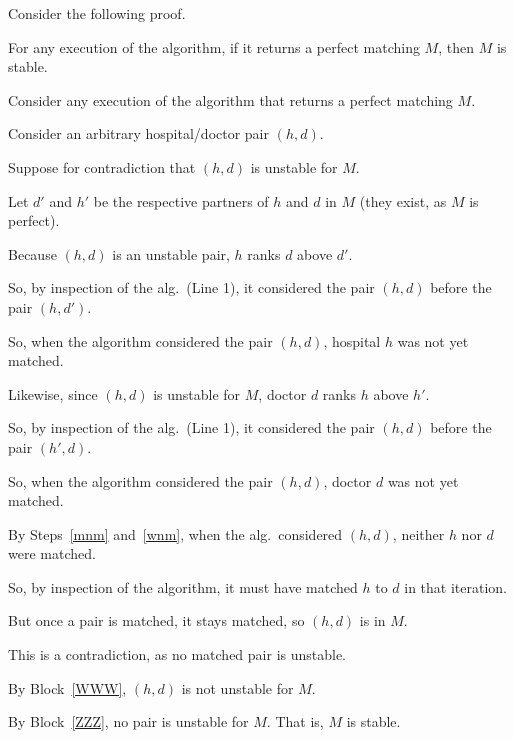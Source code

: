 \documentclass[11pt]{article}
\begin{document}
Consider the following proof.

\begin{lemma}
  For any execution of the algorithm, if it returns a perfect matching $M$, then $M$ is stable.
\end{lemma}
\begin{longFormProof}
  \step Consider any execution of the algorithm that returns a perfect matching $M$.

  \begin{block}\label{ZZZ}

    \step Consider an arbitrary hospital/doctor pair $(h, d)$.

    \begin{block}\label{WWW}
      \step Suppose for contradiction that $(h, d)$ is unstable for $M$.
      
      \step Let $d'$ and $h'$ be the respective partners of $h$ and $d$ in $M$ (they exist, as $M$ is perfect).

      \step Because $(h, d)$ is an unstable pair, $h$ ranks $d$ above $d'$.

      \step So, by inspection of the alg.~(Line 1), it considered the pair $(h, d)$ before the pair $(h, d')$. 

      \step\label{mnm} So, when the algorithm considered the pair $(h, d)$, hospital $h$ was not yet matched.

      \step Likewise, since $(h, d)$ is unstable for $M$, doctor $d$ ranks $h$ above $h'$.

      \step So, by inspection of the alg.~(Line 1), it considered the pair $(h, d)$ before the pair $(h', d)$. 

      \step\label{wnm} So, when the algorithm considered the pair $(h, d)$, doctor $d$ was not yet matched.

      \step By Steps~\ref{mnm} and~\ref{wnm},
      when the alg.~considered $(h, d)$, neither $h$ nor $d$ were matched.

      \step So, by inspection of the algorithm, it must have matched $h$ to $d$ in that iteration.

      \step But once a pair is matched, it stays matched, so $(h, d)$ is in $M$.

      \step This is a contradiction, as no matched pair is unstable.
    \end{block}

    \step By Block~\ref{WWW}, $(h, d)$ is not unstable for $M$. 
  \end{block}

  \step By Block~\ref{ZZZ}, no pair is unstable for $M$.  That is, $M$ is stable.
\end{longFormProof}
\end{document}
